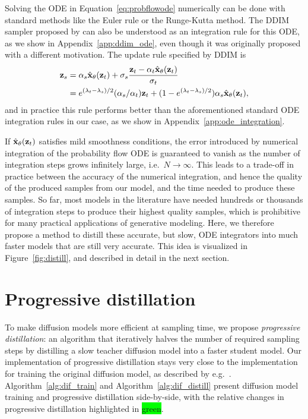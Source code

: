 \documentclass[hidelinks]{article} %
\begin{document}
Solving the ODE in Equation~\ref{eq:probflowode} numerically can be done with standard methods like the Euler rule or the Runge-Kutta method. The DDIM sampler proposed by \cite{song2020denoising} can also be understood as an integration rule for this ODE, as we show in Appendix~\ref{app:ddim_ode}, even though it was originally proposed with a different motivation. The update rule specified by DDIM is
\begin{align}
\mathbf{z}_s &= \alpha_s\hat{\mathbf{x}}_\theta(\mathbf{z}_t) + \sigma_s\frac{\mathbf{z}_t - \alpha_t\hat{\mathbf{x}}_\theta(\mathbf{z}_t)}{\sigma_t} \\
 &= e^{(\lambda_t-\lambda_s)/2}(\alpha_s/\alpha_t)\mathbf{z}_t + (1-e^{(\lambda_t-\lambda_s)/2})\alpha_s\hat{\mathbf{x}}_\theta(\mathbf{z}_t), \label{eq:ddim_logsnr}
\end{align}
and in practice this rule performs better than the aforementioned standard ODE integration rules in our case, as we show in Appendix~\ref{app:ode_integration}.

If $\hat{\mathbf{x}}_\theta(\mathbf{z}_t)$ satisfies mild smoothness conditions, the error introduced by numerical integration of the probability flow ODE is guaranteed to vanish as the number of integration steps grows infinitely large, i.e.\ $N\rightarrow\infty$. This leads to a trade-off in practice between the accuracy of the numerical integration, and hence the quality of the produced samples from our model, and the time needed to produce these samples. So far, most models in the literature have needed hundreds or thousands of integration steps to produce their highest quality samples, which is prohibitive for many practical applications of generative modeling. Here, we therefore propose a method to distill these accurate, but slow, ODE integrators into much faster models that are still very accurate. This idea is visualized in Figure~\ref{fig:distill}, and described in detail in the next section.

\section{Progressive distillation}
\label{sec:distillation}
To make diffusion models more efficient at sampling time, we propose \emph{progressive distillation}: an algorithm that iteratively halves the number of required sampling steps by distilling a slow teacher diffusion model into a faster student model. Our implementation of progressive distillation stays very close to the implementation for training the original diffusion model, as described by e.g.\ \cite{ho2020denoising}. Algorithm~\ref{alg:dif_train} and Algorithm~\ref{alg:dif_distill} present diffusion model training and progressive distillation side-by-side, with the relative changes in progressive distillation highlighted in {\setlength{\fboxsep}{0pt}\colorbox{lime}{green}}.
\end{document}
